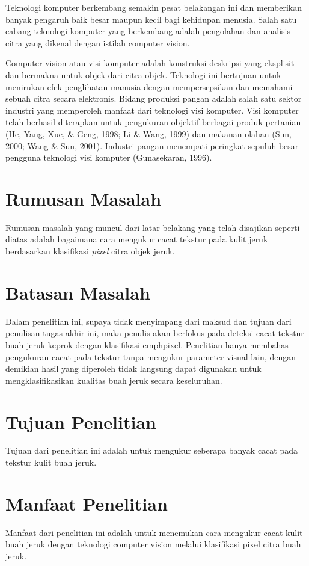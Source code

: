 \documentclass[laporan.tex]{subfiles}
\begin{document}
Teknologi komputer berkembang semakin pesat belakangan ini dan memberikan banyak pengaruh baik besar maupun kecil bagi kehidupan menusia. Salah satu cabang teknologi komputer yang berkembang adalah pengolahan dan analisis citra yang dikenal dengan istilah computer vision.

Computer vision atau visi komputer adalah konstruksi deskripsi yang eksplisit dan bermakna untuk objek dari citra objek. Teknologi ini bertujuan untuk menirukan efek penglihatan manusia dengan mempersepsikan dan memahami sebuah citra secara elektronis.
Bidang produksi pangan adalah salah satu sektor industri yang memperoleh manfaat dari teknologi visi komputer. Visi komputer telah berhasil diterapkan untuk pengukuran objektif berbagai produk pertanian (He, Yang, Xue, \& Geng, 1998; Li \& Wang, 1999) dan makanan olahan (Sun, 2000; Wang \& Sun, 2001). Industri pangan menempati peringkat sepuluh besar pengguna teknologi visi komputer (Gunasekaran, 1996).


\section{Rumusan Masalah}

Rumusan masalah yang muncul dari latar belakang yang telah disajikan seperti diatas adalah bagaimana cara mengukur cacat tekstur pada kulit jeruk berdasarkan klasifikasi \emph{pixel} citra objek jeruk.

\section{Batasan Masalah}

Dalam penelitian ini, supaya tidak menyimpang dari maksud dan tujuan dari penulisan tugas akhir ini, maka penulis akan berfokus pada deteksi cacat tekstur buah jeruk keprok dengan klasifikasi emph{pixel}. Penelitian hanya membahas pengukuran cacat pada tekstur tanpa mengukur parameter visual lain, dengan demikian hasil yang diperoleh tidak langsung dapat digunakan untuk mengklasifikasikan kualitas buah jeruk secara keseluruhan.

\section{Tujuan Penelitian}

Tujuan dari penelitian ini adalah untuk mengukur seberapa banyak cacat pada tekstur kulit buah jeruk.

\section{Manfaat Penelitian}

Manfaat dari penelitian ini adalah untuk menemukan cara mengukur cacat kulit buah jeruk dengan teknologi computer vision melalui klasifikasi pixel citra buah jeruk.
\end{document}
